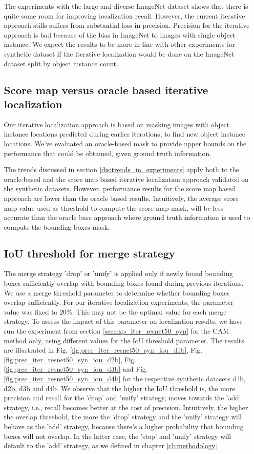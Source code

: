 The experiments with the large and diverse ImageNet dataset shows that there is quite some room for improving localization recall. However, the current iterative approach stills suffers from substantial loss in precision. Precision for the iterative approach is bad because of the bias in ImageNet to images with single object instance. We expect the results to be more in line with other experiments for synthetic dataset if the iterative localization would be done on the ImageNet dataset split by object instance count.

\subsection{Score map versus oracle based iterative localization}
Our iterative localization approach is based on masking images with object instance locations predicted during earlier iterations, to find new object instance locations. We've evaluated an oracle-based mask to provide upper bounds on the performance that could be obtained, given ground truth information. 

The trends discussed in section \ref{dis:trends_in_experiments} apply both to the oracle-based and the score map based iterative localization approach validated on the synthetic datasets. However, performance results for the score map based approach are lower than the oracle based results. Intuitively, the average score map value used as threshold to compute the score map mask, will be less accurate than the oracle base  approach where ground truth information is used to compute the bounding boxes mask. 

\subsection{IoU threshold for merge strategy}
The merge strategy 'drop' or 'unify' is applied only if newly found bounding boxes sufficiently overlap with bounding boxes found during previous iterations. We use a merge threshold parameter to determine whether bounding boxes overlap sufficiently. For our iterative localization experiments, the parameter value was fixed to 20\%. This may not be the optimal value for each merge strategy. To assess the impact of this parameter on localization results, we have run the experiment from section \ref{sec:exp_iter_resnet50_syn} for the CAM method only, using different values for the IoU threshold parameter. The results are illustrated in Fig. \ref{fig:prec_iter_resnet50_syn_iou_d1b}, Fig. \ref{fig:prec_iter_resnet50_syn_iou_d2b}, Fig. \ref{fig:prec_iter_resnet50_syn_iou_d3b} and Fig. \ref{fig:prec_iter_resnet50_syn_iou_d4b} for the respective synthetic datasets d1b, d2b, d3b and d4b. We observe that the higher the IoU threshold is, the more precision and recall for the 'drop' and 'unify' strategy, moves towards the 'add' strategy, i.e., recall becomes better at the cost of precision. Intuitively, the higher the overlap threshold, the more the 'drop' strategy and the 'unify' strategy will behave as the 'add' strategy, because there's a higher probability that bounding boxes will not overlap. In the latter case, the 'stop' and 'unify' strategy will default to the 'add' strategy, as we defined in chapter \ref{ch:methodology}.

